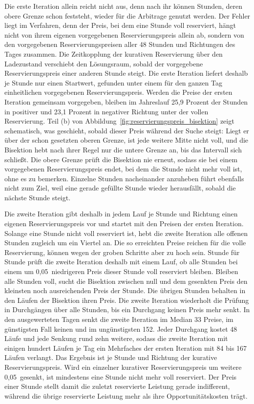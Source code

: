 Die erste Iteration allein reicht nicht aus, denn nach ihr können Stunden, deren obere Grenze schon feststeht, wieder für die Arbitrage genutzt werden.
Der Fehler liegt im Verfahren, denn der Preis, bei dem eine Stunde voll reserviert, hängt nicht von ihrem eigenen vorgegebenen Reservierungspreis allein ab, sondern von den vorgegebenen Reservierungspreisen aller 48 Stunden und Richtungen des Tages zusammen.
Die Zeitkopplung der kurativen Reservierung über den Ladezustand verschiebt den Lösungsraum, sobald der vorgegebene Reservierungspreis einer anderen Stunde steigt.
Die erste Iteration liefert deshalb je Stunde nur einen Startwert, gefunden unter einem für den ganzen Tag einheitlichen vorgegebenen Reservierungspreis.
Werden die Preise der ersten Iteration gemeinsam vorgegeben, bleiben im Jahreslauf 25,9 Prozent der Stunden in positiver und 23,1 Prozent in negativer Richtung unter der vollen Reservierung.
Teil (b) von Abbildung~\ref{fig:reservierungspreis_bisektion} zeigt schematisch, was geschieht, sobald dieser Preis während der Suche steigt: Liegt er über der schon gesetzten oberen Grenze, ist jede weitere Mitte nicht voll, und die Bisektion hebt nach ihrer Regel nur die untere Grenze an, bis das Intervall sich schließt.
Die obere Grenze prüft die Bisektion nie erneut, sodass sie bei einem vorgegebenen Reservierungspreis endet, bei dem die Stunde nicht mehr voll ist, ohne es zu bemerken.
Einzelne Stunden nacheinander anzuheben führt ebenfalls nicht zum Ziel, weil eine gerade gefüllte Stunde wieder herausfällt, sobald die nächste Stunde steigt.

Die zweite Iteration gibt deshalb in jedem Lauf je Stunde und Richtung einen eigenen Reservierungspreis vor und startet mit den Preisen der ersten Iteration.
Solange eine Stunde nicht voll reserviert ist, hebt die zweite Iteration alle offenen Stunden zugleich um ein Viertel an.
Die so erreichten Preise reichen für die volle Reservierung, können wegen der groben Schritte aber zu hoch sein.
Stunde für Stunde prüft die zweite Iteration deshalb mit einem Lauf, ob alle Stunden bei einem um 0,05\,\EurMWh{} niedrigeren Preis dieser Stunde voll reserviert bleiben.
Bleiben alle Stunden voll, sucht die Bisektion zwischen null und dem gesenkten Preis den kleinsten noch ausreichenden Preis der Stunde.
Die übrigen Stunden behalten in den Läufen der Bisektion ihren Preis.
Die zweite Iteration wiederholt die Prüfung in Durchgängen über alle Stunden, bis ein Durchgang keinen Preis mehr senkt.
In den ausgewerteten Tagen senkt die zweite Iteration im Median 33 Preise, im günstigsten Fall keinen und im ungünstigsten 152.
Jeder Durchgang kostet 48 Läufe und jede Senkung rund zehn weitere, sodass die zweite Iteration mit einigen hundert Läufen je Tag ein Mehrfaches der ersten Iteration mit 84 bis 167 Läufen verlangt.
Das Ergebnis ist je Stunde und Richtung der kurative Reservierungspreis.
Wird ein einzelner kurativer Reservierungspreis um weitere 0,05\,\EurMWh{} gesenkt, ist mindestens eine Stunde nicht mehr voll reserviert.
Der Preis einer Stunde stellt damit die zuletzt reservierte Leistung gerade indifferent, während die übrige reservierte Leistung mehr als ihre Opportunitätskosten trägt.

